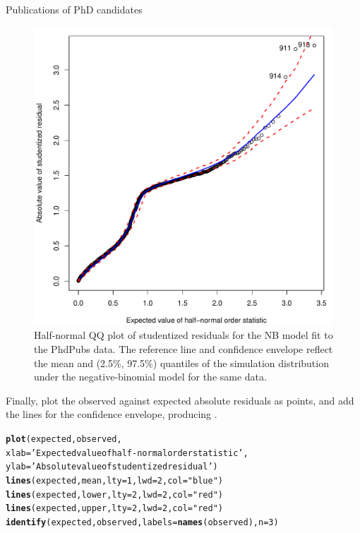 \documentclass[11pt]{book}\usepackage[]{graphicx}\usepackage[]{color}
\makeatletter
\newcommand{\hlnum}[1]{\textcolor[rgb]{0.686,0.059,0.569}{#1}}%
\newcommand{\hlstr}[1]{\textcolor[rgb]{0.192,0.494,0.8}{#1}}%
\newcommand{\hlstd}[1]{\textcolor[rgb]{0.345,0.345,0.345}{#1}}%
\newcommand{\hlkwc}[1]{\textcolor[rgb]{0.333,0.667,0.333}{#1}}%
\newcommand{\hlkwd}[1]{\textcolor[rgb]{0.737,0.353,0.396}{\textbf{#1}}}%
\newenvironment{kframe}{%
 \def\at@end@of@kframe{}%
 \ifinner\ifhmode%
  \def\at@end@of@kframe{\end{minipage}}%
  \begin{minipage}{\columnwidth}%
 \fi\fi%
 \def\FrameCommand##1{\hskip\@totalleftmargin \hskip-\fboxsep
 \colorbox{shadecolor}{##1}\hskip-\fboxsep
     \hskip-\linewidth \hskip-\@totalleftmargin \hskip\columnwidth}%
 \MakeFramed {\advance\hsize-\width
   \@totalleftmargin\z@ \linewidth\hsize
   \@setminipage}}%
 {\par\unskip\endMakeFramed%
 \at@end@of@kframe}
\newenvironment{knitrout}{}{} %
\renewenvironment{knitrout}{\small\renewcommand{\baselinestretch}{.85}}{} %
\makeatother
\begin{document}
\begin{Example}[phdpubs6]{Publications of PhD candidates}
\begin{figure}[htb]
  \centering
  \includegraphics[width=.5\textwidth]{ch09/fig/phd-halfnorm.pdf}
  \caption{Half-normal QQ plot of studentized residuals for the NB model fit to the PhdPubs data. The reference line and confidence envelope reflect the mean and (2.5\%, 97.5\%) quantiles of the simulation distribution under the negative-binomial model for the same data.}
  \label{fig:phd-halfnorm}
\end{figure}

Finally, plot the observed against expected absolute residuals as points, and add the lines for the confidence envelope,
producing .
\begin{knitrout}
\color{fgcolor}\begin{kframe}
\begin{alltt}
\hlkwd{plot}\hlstd{(expected, observed,}
     \hlkwc{xlab}\hlstd{=}\hlstr{'Expected value of half-normal order statistic'}\hlstd{,}
     \hlkwc{ylab}\hlstd{=}\hlstr{'Absolute value of studentized residual'}\hlstd{)}
\hlkwd{lines}\hlstd{(expected, mean,} \hlkwc{lty}\hlstd{=}\hlnum{1}\hlstd{,} \hlkwc{lwd}\hlstd{=}\hlnum{2}\hlstd{,} \hlkwc{col}\hlstd{=}\hlstr{"blue"}\hlstd{)}
\hlkwd{lines}\hlstd{(expected, lower,} \hlkwc{lty}\hlstd{=}\hlnum{2}\hlstd{,} \hlkwc{lwd}\hlstd{=}\hlnum{2}\hlstd{,} \hlkwc{col}\hlstd{=}\hlstr{"red"}\hlstd{)}
\hlkwd{lines}\hlstd{(expected, upper,} \hlkwc{lty}\hlstd{=}\hlnum{2}\hlstd{,} \hlkwc{lwd}\hlstd{=}\hlnum{2}\hlstd{,} \hlkwc{col}\hlstd{=}\hlstr{"red"}\hlstd{)}
\hlkwd{identify}\hlstd{(expected, observed,} \hlkwc{labels}\hlstd{=}\hlkwd{names}\hlstd{(observed),} \hlkwc{n}\hlstd{=}\hlnum{3}\hlstd{)}
\end{alltt}
\end{kframe}
\end{knitrout}


\end{Example}
\end{document}
